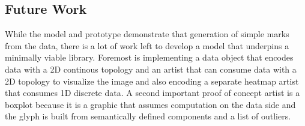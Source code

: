 \documentclass[../main.tex]{subfiles}
\begin{document}
\subsection{Future Work}
While the model and prototype demonstrate that generation of simple marks from the data, there is a lot of work left to develop a model that underpins a minimally viable library. Foremost is implementing a data object that encodes data with a 2D continous topology and an artist that can consume data with a 2D topology to visualize the image\cite{toryRethinkingVisualizationHighLevel2004,haber1990visualization,hansen2011visualization} and also encoding a separate heatmap\cite{wilkinsonHistoryClusterHeat2009,loua1873atlas} artist that consumes 1D discrete data.  A second important proof of concept artist is a boxplot\cite{wickham40YearsBoxplots2011} because it is a graphic that assumes computation on the data side and the glyph is built from semantically defined components and a list of outliers.
\end{document}
